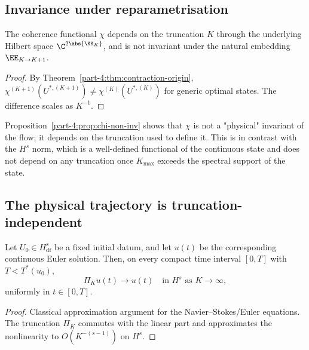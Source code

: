 \subsection{Invariance under reparametrisation}
\label{part-4:ssec:invariance}

\begin{proposition}\label{part-4:prop:chi-non-inv}
The coherence functional $\chi$ depends on the truncation $K$ 
through the underlying Hilbert space $\C^{2\abs{\KK_K}}$, and is not 
invariant under the natural embedding $\EE_{K\to K+1}$.
\end{proposition}

\begin{proof}
By Theorem~\ref{part-4:thm:contraction-origin}, $\chi^{(K+1)}(U^{\ast,(K+1)}) 
\neq \chi^{(K)}(U^{\ast,(K)})$ for generic optimal states. The 
difference scales as $K^{-1}$.
\end{proof}

\begin{remark}[Interpretation]\label{part-4:rem:contraction-interp}
Proposition~\ref{part-4:prop:chi-non-inv} shows that $\chi$ is not a 
"physical" invariant of the flow; it depends on the truncation used 
to define it. This is in contrast with the $H^s$ norm, which is a 
well-defined functional of the continuous state and does not depend 
on any truncation once $K_{\max}$ exceeds the spectral support of 
the state.
\end{remark}

\subsection{The physical trajectory is truncation-independent}
\label{part-4:ssec:physical-trajectory}

\begin{proposition}\label{part-4:prop:phys-indep}
Let $U_0\in H^s_{\mathrm{df}}$ be a fixed initial datum, and let 
$u(t)$ be the corresponding continuous Euler solution. Then, on 
every compact time interval $[0,T]$ with $T<T^\ast(u_0)$,
\begin{equation}\label{part-4:eq:phys-indep}
\Pi_K u(t) \to u(t) \quad\text{in }H^s\text{ as }K\to\infty,
\end{equation}
uniformly in $t\in[0,T]$.
\end{proposition}

\begin{proof}
Classical approximation argument for the Navier--Stokes/Euler 
equations. The truncation $\Pi_K$ commutes with the linear part and 
approximates the nonlinearity to $O(K^{-(s-1)})$ on $H^s$.
\end{proof}

